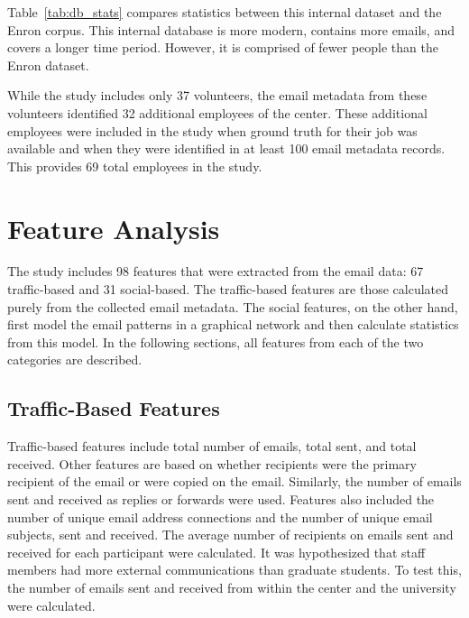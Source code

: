 \documentclass[12pt]{report}
\begin{document}
\begin{table}[t]
\centering
\caption{A comparison between the internal dataset and the Enron email corpus.}
\label{tab:db_stats}
\end{table}


Table~\ref{tab:db_stats} compares statistics between this internal dataset and the Enron corpus.
This internal database is more modern, contains more emails, and covers a longer time period.
However, it is comprised of fewer people than the Enron dataset.

While the study includes only 37 volunteers, the email metadata from these volunteers identified 32 additional employees of the center.
These additional employees were included in the study when ground truth for their job was available and when they were identified in at least 100 email metadata records.
This provides 69 total employees in the study.


\chapter{Feature Analysis} \label{Features}
The study includes 98 features that were extracted from the email data: 67 traffic-based and 31 social-based.
The traffic-based features are those calculated purely from the collected email metadata.
The social features, on the other hand, first model the email patterns in a graphical network and then calculate statistics from this model.
In the following sections, all features from each of the two categories are described. 

\section{Traffic-Based Features}
Traffic-based features include total number of emails, total sent, and total received.
Other features are based on whether recipients were the primary recipient of the email or were copied on the email.
Similarly, the number of emails sent and received as replies or forwards were used.
Features also included the number of unique email address connections and the number of unique email subjects, sent and received.
The average number of recipients on emails sent and received for each participant were calculated.
It was hypothesized that staff members had more external communications than graduate students.
To test this, the number of emails sent and received from within the center and the university were calculated.  
\end{document}
